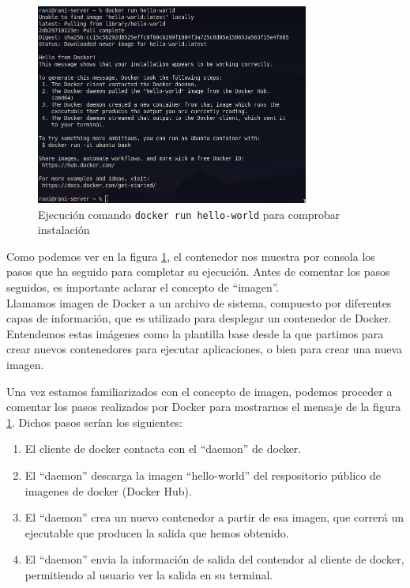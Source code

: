\documentclass[12pt]{article}
\begin{document}
	\begin{figure}[h]
		\begin{center}
			\includegraphics[width=0.8\textwidth]{img/docker_hello-world.png}
			\caption{Ejecución comando \texttt{docker run hello-world} para comprobar instalación}
			\label{img: docker hello world}
		\end{center}
	\end{figure}

	\noindent Como podemos ver en la figura \ref{img: docker hello world}, el contenedor nos muestra por consola los pasos que ha seguido para completar su ejecución. Antes de comentar los pasos seguidos, es importante aclarar el concepto de ``imagen''. \\
	
	\noindent Llamamos imagen de Docker a un archivo de sistema, compuesto por diferentes capas de información, que es utilizado para desplegar un contenedor de Docker. Entendemos estas imágenes como la plantilla base desde la que partimos para crear nuevos contenedores para ejecutar aplicaciones, o bien para crear una nueva imagen.\\
	
	\pagebreak
	
	\noindent Una vez estamos familiarizados con el concepto de imagen, podemos proceder a comentar los pasos realizados por Docker para mostrarnos el mensaje de la figura \ref{img: docker hello world}. Dichos pasos serían los siguientes:
	\begin{enumerate}
		\item El cliente de docker contacta con el ``daemon'' de docker.
		\item El ``daemon'' descarga la imagen  ``hello-world'' del respositorio público de imagenes de docker (Docker Hub).
		\item El ``daemon'' crea un nuevo contenedor a partir de esa imagen, que correrá un ejecutable que producen la salida que hemos obtenido.
		\item El ``daemon'' envia la información de salida del contendor al cliente de docker, permitiendo al usuario ver la salida en su terminal.
	\end{enumerate}
\end{document}
